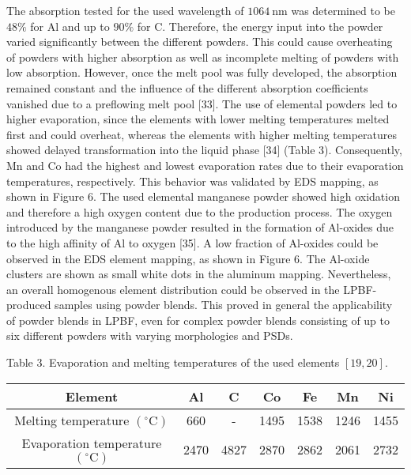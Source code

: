 \documentclass[10pt]{article}
\begin{document}
The absorption tested for the used wavelength of $1064 \mathrm{~nm}$ was determined to be $48 \%$ for $\mathrm{Al}$ and up to $90 \%$ for C. Therefore, the energy input into the powder varied significantly between the different powders. This could cause overheating of powders with higher absorption as well as incomplete melting of powders with low absorption. However, once the melt pool was fully developed, the absorption remained constant and the influence of the different absorption coefficients vanished due to a preflowing melt pool [33]. The use of elemental powders led to higher evaporation, since the elements with lower melting temperatures melted first and could overheat, whereas the elements with higher melting temperatures showed delayed transformation into the liquid phase [34] (Table 3). Consequently, Mn and Co had the highest and lowest evaporation rates due to their evaporation temperatures, respectively. This behavior was validated by EDS mapping, as shown in Figure 6. The used elemental manganese powder showed high oxidation and therefore a high oxygen content due to the production process. The oxygen introduced by the manganese powder resulted in the formation of Al-oxides due to the high affinity of $\mathrm{Al}$ to oxygen [35]. A low fraction of Al-oxides could be observed in the EDS element mapping, as shown in Figure 6. The Al-oxide clusters are shown as small white dots in the aluminum mapping. Nevertheless, an overall homogenous element distribution could be observed in the LPBF-produced samples using powder blends. This proved in general the applicability of powder blends in LPBF, even for complex powder blends consisting of up to six different powders with varying morphologies and PSDs.

Table 3. Evaporation and melting temperatures of the used elements $[19,20]$.

\begin{center}
\begin{tabular}{ccccccc}
\hline
Element & Al & C & Co & Fe & Mn & Ni \\
\hline
Melting temperature $\left({ }^{\circ} \mathrm{C}\right)$ & 660 & - & 1495 & 1538 & 1246 & 1455 \\
Evaporation temperature $\left({ }^{\circ} \mathrm{C}\right)$ & 2470 & 4827 & 2870 & 2862 & 2061 & 2732 \\
\hline
\end{tabular}
\end{center}
\end{document}

